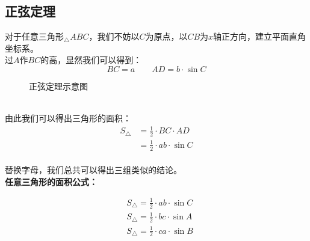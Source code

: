 \documentclass[UTF8]{ctexart}
\begin{document}
\subsection{正弦定理}
    对于任意三角形$_\triangle ABC$，我们不妨以$C$为原点，以$CB$为$x$轴正方向，建立平面直角坐标系。\\[3mm]
    过$A$作$BC$的高，显然我们可以得到：
    \setcounter{equation}{0}
    \begin{equation}
        BC=a\qquad AD=b\cdot\sin{C}
    \end{equation}
    \begin{figure}[h]
        \begin{center}
            \caption{正弦定理示意图}
        \end{center}
    \end{figure}\\
    由此我们可以得出三角形的面积：
    \begin{align}
        S_{\triangle}&=\frac{1}{2}\cdot BC \cdot AD\\[3mm]
        &=\frac{1}{2}\cdot ab \cdot \sin{C}
    \end{align}\\
    替换字母，我们总共可以得出三组类似的结论。\\[4mm]
    \textbf{任意三角形的面积公式：}
    \begin{large}
        \begin{align*}
            &S_{\triangle}=\frac{1}{2}\cdot ab \cdot \sin{C}\\[3mm]
            &S_{\triangle}=\frac{1}{2}\cdot bc \cdot \sin{A}\\[3mm]
            &S_{\triangle}=\frac{1}{2}\cdot ca \cdot \sin{B}
        \end{align*}
    \end{large}\\
\end{document}
